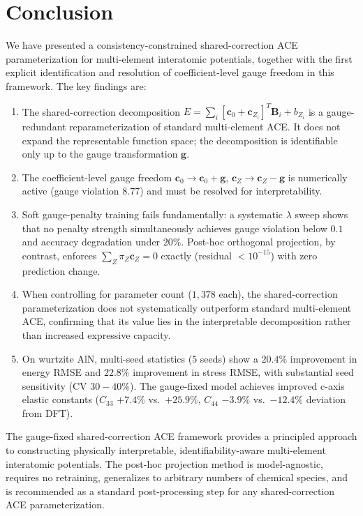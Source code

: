 \documentclass[twoside,prb,aps,floatfix,superscriptaddress,longbibliography]{revtex4-2}
\begin{document}
\section{Conclusion}
\label{sec:conclusion}

We have presented a consistency-constrained shared-correction ACE parameterization for multi-element interatomic potentials, together with the first explicit identification and resolution of coefficient-level gauge freedom in this framework. The key findings are:

\begin{enumerate}[label=\textbf{(F\arabic*)}]
    \item The shared-correction decomposition $E = \sum_i [\mathbf{c}_0 + \mathbf{c}_{Z_i}]^T \mathbf{B}_i + b_{Z_i}$ is a gauge-redundant reparameterization of standard multi-element ACE. It does not expand the representable function space; the decomposition is identifiable only up to the gauge transformation $\mathbf{g}$.
    \item The coefficient-level gauge freedom $\mathbf{c}_0 \to \mathbf{c}_0 + \mathbf{g}$, $\mathbf{c}_Z \to \mathbf{c}_Z - \mathbf{g}$ is numerically active (gauge violation $8.77$) and must be resolved for interpretability.
    \item Soft gauge-penalty training fails fundamentally: a systematic $\lambda$ sweep shows that no penalty strength simultaneously achieves gauge violation below $0.1$ and accuracy degradation under $20\%$. Post-hoc orthogonal projection, by contrast, enforces $\sum_Z \pi_Z \mathbf{c}_Z = 0$ exactly (residual $< 10^{-15}$) with zero prediction change.
    \item When controlling for parameter count ($1{,}378$ each), the shared-correction parameterization does not systematically outperform standard multi-element ACE, confirming that its value lies in the interpretable decomposition rather than increased expressive capacity.
    \item On wurtzite AlN, multi-seed statistics ($5$ seeds) show a $20.4\%$ improvement in energy RMSE and $22.8\%$ improvement in stress RMSE, with substantial seed sensitivity (CV $30{-}40\%$). The gauge-fixed model achieves improved c-axis elastic constants ($C_{33}$ $+7.4\%$ vs.\ $+25.9\%$, $C_{44}$ $-3.9\%$ vs.\ $-12.4\%$ deviation from DFT).
\end{enumerate}

The gauge-fixed shared-correction ACE framework provides a principled approach to constructing physically interpretable, identifiability-aware multi-element interatomic potentials. The post-hoc projection method is model-agnostic, requires no retraining, generalizes to arbitrary numbers of chemical species, and is recommended as a standard post-processing step for any shared-correction ACE parameterization.
\end{document}
